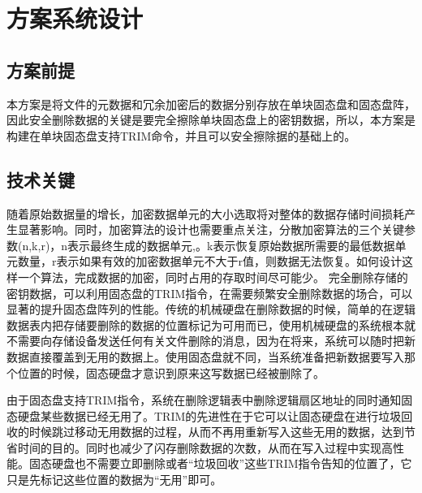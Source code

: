 \chapter{方案系统设计}
\section{方案前提}
本方案是将文件的元数据和冗余加密后的数据分别存放在单块固态盘和固态盘阵，因此安全删除数据的关键是要完全擦除单块固态盘上的密钥数据，所以，本方案是构建在单块固态盘支持TRIM命令，并且可以安全擦除据的基础上的。
\section{技术关键}
随着原始数据量的增长，加密数据单元的大小选取将对整体的数据存储时间损耗产生显著影响。同时，加密算法的设计也需要重点关注，分散加密算法的三个关键参数(n,k,r)，n表示最终生成的数据单元,。k表示恢复原始数据所需要的最低数据单元数量，r表示如果有效的加密数据单元不大于r值，则数据无法恢复。如何设计这样一个算法，完成数据的加密，同时占用的存取时间尽可能少。 
完全删除存储的密钥数据，可以利用固态盘的TRIM指令，在需要频繁安全删除数据的场合，可以显著的提升固态盘阵列的性能。传统的机械硬盘在删除数据的时候，简单的在逻辑数据表内把存储要删除的数据的位置标记为可用而已，使用机械硬盘的系统根本就不需要向存储设备发送任何有关文件删除的消息，因为在将来，系统可以随时把新数据直接覆盖到无用的数据上。使用固态盘就不同，当系统准备把新数据要写入那个位置的时候，固态硬盘才意识到原来这写数据已经被删除了。


由于固态盘支持TRIM指令，系统在删除逻辑表中删除逻辑扇区地址的同时通知固态硬盘某些数据已经无用了。TRIM的先进性在于它可以让固态硬盘在进行垃圾回收的时候跳过移动无用数据的过程，从而不再用重新写入这些无用的数据，达到节省时间的目的。同时也减少了闪存删除数据的次数，从而在写入过程中实现高性能。固态硬盘也不需要立即删除或者“垃圾回收”这些TRIM指令告知的位置了，它只是先标记这些位置的数据为“无用”即可。


